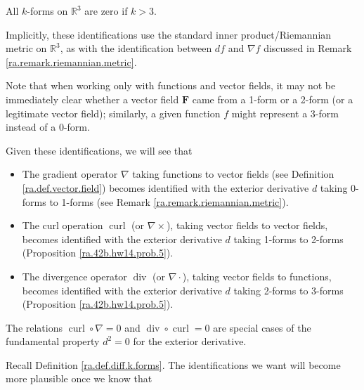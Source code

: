 All \(k\)-forms on \(\mathbb{R}^3\) are zero if \(k > 3\).

\begin{remark}

Implicitly, these identifications use the standard inner product/Riemannian metric on \(\mathbb{R}^3\), as with the identification between \(df\) and \(\nabla f\) discussed in Remark \ref{ra.remark.riemannian.metric}.

Note that when working only with functions and vector fields, it may not be immediately clear whether a vector field \(\boldsymbol{F}\) came from a 1-form or a 2-form (or a legitimate vector field); similarly, a given function \(f\) might represent a 3-form instead of a 0-form.

\end{remark}

Given these identifications, we will see that 

\begin{itemize}

\item The gradient operator \(\nabla\) taking functions to vector fields (see Definition \ref{ra.def.vector.field}) becomes identified with the exterior derivative \(d\) taking 0-forms to 1-forms (see Remark \ref{ra.remark.riemannian.metric}).

\item The curl operation \(\operatorname{curl}\) (or \(\nabla \times\)), taking vector fields to vector fields, becomes identified with the exterior derivative \(d\) taking 1-forms to 2-forms (Proposition \ref{ra.42b.hw14.prob.5}).

\item The divergence operator \(\operatorname{div}\) (or \(\nabla \cdot\)), taking vector fields to functions, becomes identified with the exterior derivative \(d\) taking 2-forms to 3-forms (Proposition \ref{ra.42b.hw14.prob.5}).

\end{itemize}

The relations \(\operatorname{curl} \circ \nabla = 0\) and \(\operatorname{div} \circ \operatorname{curl} = 0\) are special cases of the fundamental property \(d^2 = 0\) for the exterior derivative.



Recall Definition \ref{ra.def.diff.k.forms}. The identifications we want will become more plausible once we know that 

